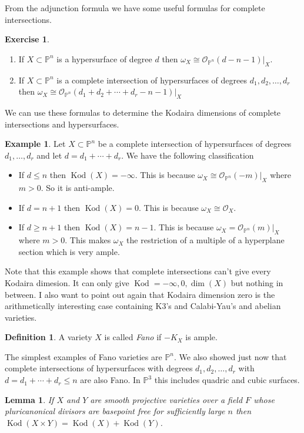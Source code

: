 \documentclass[12pt]{article}
\numberwithin{equation}{section}
\newtheorem{lemma}[theorem]{Lemma}
\theoremstyle{definition}
\newtheorem{definition}[theorem]{Definition}
\newtheorem{example}[theorem]{Example}
\newtheorem{exercise}[theorem]{Exercise}
\theoremstyle{remark}
\newcommand{\Ocal}{\mathcal{O}}
\newcommand{\PP}{\mathbb{P}}
\newcommand{\kod}{\operatorname{Kod}}
\begin{document}
From the adjunction formula we have some useful formulas for complete intersections. 
\begin{exercise}
	\begin{enumerate}
	\item If $X\subset \PP^n$ is a hypersurface of degree $d$ then $\omega_X \cong \Ocal_{\PP^n}(d-n-1)\vert_X$.
	\item If $X\subset \PP^n$ is a complete intersection of hypersurfaces of degrees $d_1,d_2,\ldots,d_r$ then $\omega_X \cong \Ocal_{\PP^n}(d_1+d_2+\cdots + d_r -n-1)\vert_X$
	\end{enumerate}
We can use these formulas to determine the Kodaira dimensions of complete intersections and hypersurfaces. 
\begin{example}
	Let $X\subset \PP^n$ be a complete intersection of hypersurfaces of degrees $d_1,\ldots, d_r$ and let $d=d_1+\cdots +d_r$. 
	We have the following classification
	\begin{itemize}
		\item If $d \leq n$ then $\kod(X) = -\infty$. 
		This is because $\omega_X \cong \Ocal_{\PP^n}(-m)\vert_X$ where $m>0$. 
		So it is anti-ample.
		\item If $d=n+1$ then $\kod(X)=0$. This is because $\omega_X \cong \Ocal_X$. 
		\item If $d\geq n+1$ then $\kod(X)=n-1$. 
		This is because $\omega_X = \Ocal_{\PP^n}(m)\vert_{X}$ where $m>0$. 
		This makes $\omega_X$ the restriction of a multiple of a hyperplane section which is very ample. 
	\end{itemize}
\end{example}	
\end{exercise}
Note that this example shows that complete intersections can't give every Kodaira dimesion.
It can only give $\kod=-\infty,0,\dim(X)$ but nothing in between.
I also want to point out again that Kodaira dimension zero is the arithmetically interesting case containing K3's and Calabi-Yau's and abelian varieties. 

\begin{definition}
	A variety $X$ is called \emph{Fano} if $-K_X$ is ample. 
\end{definition}
The simplest examples of Fano varieties are $\PP^n$.
We also showed just now that complete intersections of hypersurfaces with degrees $d_1,d_2,\ldots,d_r$ with $d=d_1+\cdots+d_r\leq n$ are also Fano.
In $\PP^3$ this includes quadric and cubic surfaces.

\begin{lemma}\label{lem:kodaira-additive}
	If $X$ and $Y$ are smooth projective varieties over a field $F$ whose pluricanonical divisors are basepoint free for sufficiently large $n$ then 
	$\kod(X\times Y) = \kod(X) + \kod(Y)$.
\end{lemma} 
\end{document}
